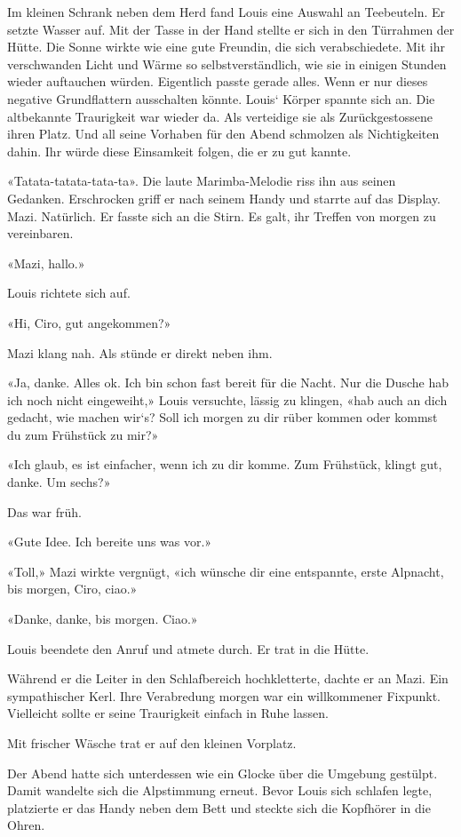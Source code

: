 Im kleinen Schrank neben dem Herd fand Louis eine Auswahl an Teebeuteln.
Er setzte Wasser auf. Mit der Tasse in der Hand stellte er sich in den
Türrahmen der Hütte. Die Sonne wirkte wie eine gute Freundin, die sich
verabschiedete. Mit ihr verschwanden Licht und Wärme so
selbstverständlich, wie sie in einigen Stunden wieder auftauchen würden.
Eigentlich passte gerade alles. Wenn er nur dieses negative
Grundflattern ausschalten könnte. Louis` Körper spannte sich an. Die
altbekannte Traurigkeit war wieder da. Als verteidige sie als
Zurückgestossene ihren Platz. Und all seine Vorhaben für den Abend
schmolzen als Nichtigkeiten dahin. Ihr würde diese Einsamkeit folgen,
die er zu gut kannte.

«Tatata-tatata-tata-ta». Die laute Marimba-Melodie riss ihn aus seinen
Gedanken. Erschrocken griff er nach seinem Handy und starrte auf das
Display. Mazi. Natürlich. Er fasste sich an die Stirn. Es galt, ihr
Treffen von morgen zu vereinbaren.

«Mazi, hallo.»

Louis richtete sich auf.

«Hi, Ciro, gut angekommen?»

Mazi klang nah. Als stünde er direkt neben ihm.

«Ja, danke. Alles ok. Ich bin schon fast bereit für die Nacht. Nur die
Dusche hab ich noch nicht eingeweiht,» Louis versuchte, lässig zu
klingen, «hab auch an dich gedacht, wie machen wir`s? Soll ich morgen zu
dir rüber kommen oder kommst du zum Frühstück zu mir?»

«Ich glaub, es ist einfacher, wenn ich zu dir komme. Zum Frühstück,
klingt gut, danke. Um sechs?»

Das war früh.

«Gute Idee. Ich bereite uns was vor.»

«Toll,» Mazi wirkte vergnügt, «ich wünsche dir eine entspannte, erste
Alpnacht, bis morgen, Ciro, ciao.»

«Danke, danke, bis morgen. Ciao.»

Louis beendete den Anruf und atmete durch. Er trat in die Hütte.

Während er die Leiter in den Schlafbereich hochkletterte, dachte er an
Mazi. Ein sympathischer Kerl. Ihre Verabredung morgen war ein
willkommener Fixpunkt. Vielleicht sollte er seine Traurigkeit einfach in
Ruhe lassen.

Mit frischer Wäsche trat er auf den kleinen Vorplatz.

Der Abend hatte sich unterdessen wie ein Glocke über die Umgebung
gestülpt. Damit wandelte sich die Alpstimmung erneut. Bevor Louis sich
schlafen legte, platzierte er das Handy neben dem Bett und steckte sich
die Kopfhörer in die Ohren.

